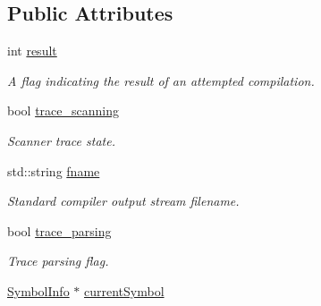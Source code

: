 \subsection*{Public Attributes}
\begin{DoxyCompactItemize}
\item 
\hypertarget{classCCompiler_ac83135baa1380874cf2e30bc1d3d9294}{int \hyperlink{classCCompiler_ac83135baa1380874cf2e30bc1d3d9294}{result}}\label{classCCompiler_ac83135baa1380874cf2e30bc1d3d9294}

\begin{DoxyCompactList}\small\item\em A flag indicating the result of an attempted compilation. \end{DoxyCompactList}\item 
\hypertarget{classCCompiler_aa9769e9f7417698ce18ab9c668650ad0}{bool \hyperlink{classCCompiler_aa9769e9f7417698ce18ab9c668650ad0}{trace\-\_\-scanning}}\label{classCCompiler_aa9769e9f7417698ce18ab9c668650ad0}

\begin{DoxyCompactList}\small\item\em Scanner trace state. \end{DoxyCompactList}\item 
\hypertarget{classCCompiler_a60b1cadb0db77e19be3b13e80ceade72}{std\-::string \hyperlink{classCCompiler_a60b1cadb0db77e19be3b13e80ceade72}{fname}}\label{classCCompiler_a60b1cadb0db77e19be3b13e80ceade72}

\begin{DoxyCompactList}\small\item\em Standard compiler output stream filename. \end{DoxyCompactList}\item 
\hypertarget{classCCompiler_a9959c74a24cffc0a33e981091b46ef01}{bool \hyperlink{classCCompiler_a9959c74a24cffc0a33e981091b46ef01}{trace\-\_\-parsing}}\label{classCCompiler_a9959c74a24cffc0a33e981091b46ef01}

\begin{DoxyCompactList}\small\item\em Trace parsing flag. \end{DoxyCompactList}\item 
\hypertarget{classCCompiler_a5ec2690957bb31fb7942789d55ac9e76}{\hyperlink{structSymbolInfo}{Symbol\-Info} $\ast$ \hyperlink{classCCompiler_a5ec2690957bb31fb7942789d55ac9e76}{current\-Symbol}}\label{classCCompiler_a5ec2690957bb31fb7942789d55ac9e76}


\end{DoxyCompactItemize}
